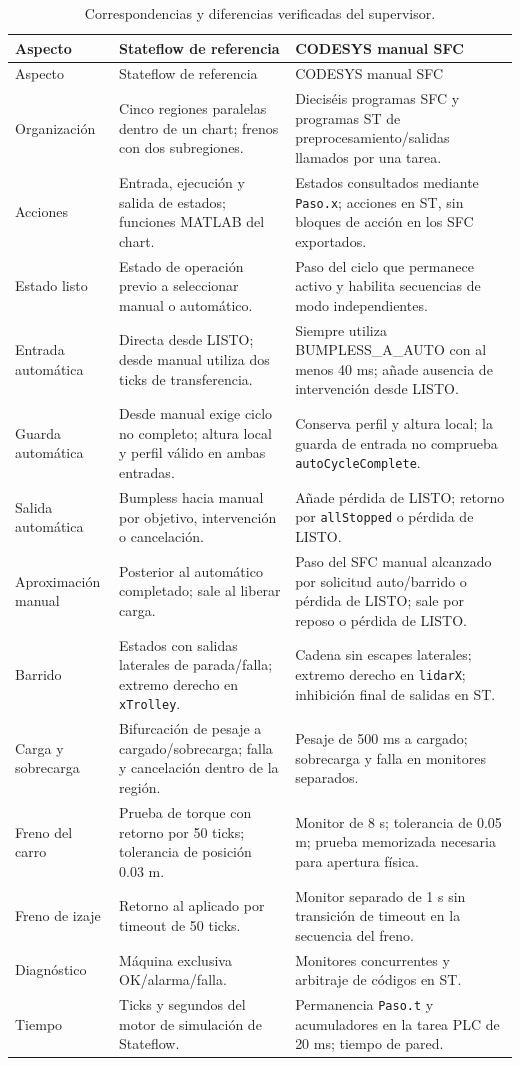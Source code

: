 \documentclass[a4paper,10pt,onecolumn,journal]{ieeeconf}
\numberwithin{equation}{section}
\begin{document}
{\footnotesize
\begin{longtable}{L{3.0cm} L{5.8cm} L{5.8cm}}
\caption{Correspondencias y diferencias verificadas del supervisor.}\label{tab:comparacion_sup_sfc}\\
\toprule
Aspecto & Stateflow de referencia & CODESYS manual SFC\\
\midrule
\endfirsthead
\toprule Aspecto & Stateflow de referencia & CODESYS manual SFC\\\midrule
\endhead
Organización & Cinco regiones paralelas dentro de un chart; frenos con dos subregiones. & Dieciséis programas SFC y programas ST de preprocesamiento/salidas llamados por una tarea.\\
Acciones & Entrada, ejecución y salida de estados; funciones MATLAB del chart. & Estados consultados mediante \texttt{Paso.x}; acciones en ST, sin bloques de acción en los SFC exportados.\\
Estado listo & Estado de operación previo a seleccionar manual o automático. & Paso del ciclo que permanece activo y habilita secuencias de modo independientes.\\
Entrada automática & Directa desde LISTO; desde manual utiliza dos ticks de transferencia. & Siempre utiliza BUMPLESS\_A\_AUTO con al menos 40 ms; añade ausencia de intervención desde LISTO.\\
Guarda automática & Desde manual exige ciclo no completo; altura local y perfil válido en ambas entradas. & Conserva perfil y altura local; la guarda de entrada no comprueba \texttt{autoCycleComplete}.\\
Salida automática & Bumpless hacia manual por objetivo, intervención o cancelación. & Añade pérdida de LISTO; retorno por \texttt{allStopped} o pérdida de LISTO.\\
Aproximación manual & Posterior al automático completado; sale al liberar carga. & Paso del SFC manual alcanzado por solicitud auto/barrido o pérdida de LISTO; sale por reposo o pérdida de LISTO.\\
Barrido & Estados con salidas laterales de parada/falla; extremo derecho en \texttt{xTrolley}. & Cadena sin escapes laterales; extremo derecho en \texttt{lidarX}; inhibición final de salidas en ST.\\
Carga y sobrecarga & Bifurcación de pesaje a cargado/sobrecarga; falla y cancelación dentro de la región. & Pesaje de 500 ms a cargado; sobrecarga y falla en monitores separados.\\
Freno del carro & Prueba de torque con retorno por 50 ticks; tolerancia de posición 0.03 m. & Monitor de 8 s; tolerancia de 0.05 m; prueba memorizada necesaria para apertura física.\\
Freno de izaje & Retorno al aplicado por timeout de 50 ticks. & Monitor separado de 1 s sin transición de timeout en la secuencia del freno.\\
Diagnóstico & Máquina exclusiva OK/alarma/falla. & Monitores concurrentes y arbitraje de códigos en ST.\\
Tiempo & Ticks y segundos del motor de simulación de Stateflow. & Permanencia \texttt{Paso.t} y acumuladores en la tarea PLC de 20 ms; tiempo de pared.\\
\bottomrule
\end{longtable}}
\end{document}
